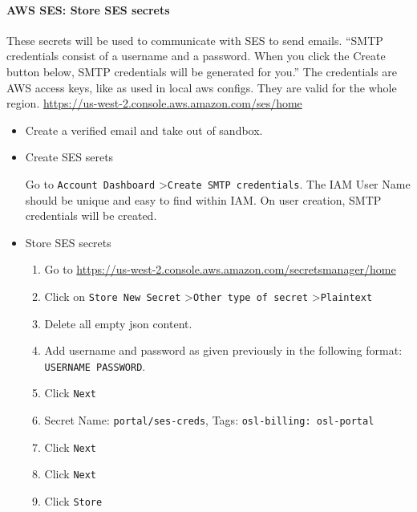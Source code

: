 \paragraph{AWS SES: Store SES secrets}

These secrets will be used to communicate with SES to send emails. ``SMTP credentials consist of a username and a password. When you click the Create button below, SMTP credentials will be generated for you.'' The credentials are AWS access keys, like as used in local aws configs. They are valid for the whole region. \href{https://us-west-2.console.aws.amazon.com/ses/home}{https://us-west-2.console.aws.amazon.com/ses/home}

\begin{itemize}
\item Create a verified email and take out of sandbox.


\item Create SES serets

Go to \texttt{Account Dashboard} \textgreater  \texttt{Create SMTP credentials}. The IAM User Name should be unique and easy to find within IAM. On user creation, SMTP credentials will be created.


\item Store SES secrets

\begin{enumerate}
\item Go to \href{https://us-west-2.console.aws.amazon.com/secretsmanager/home}{https://us-west-2.console.aws.amazon.com/secretsmanager/home}


\item Click on \texttt{Store New Secret} \textgreater  \texttt{Other type of secret} \textgreater  \texttt{Plaintext}


\item Delete all empty json content.


\item Add username and password as given previously in the following format: \texttt{USERNAME PASSWORD}.


\item Click \texttt{Next}


\item Secret Name: \texttt{portal/ses-creds}, Tags: \texttt{osl-billing: osl-portal}


\item Click \texttt{Next}


\item Click \texttt{Next}


\item Click \texttt{Store}
\end{enumerate}
\end{itemize}

